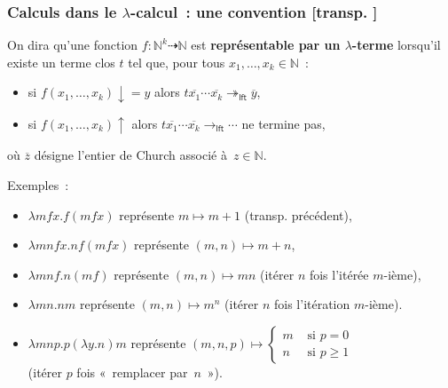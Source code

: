 \documentclass[mathserif,a4paper,aspectratio=169]{beamer}
\renewcommand{\frametitle}[1]{\subsubsection*{#1 {\footnotesize[transp. \insertframenumber]}}}
\begin{document}
%
\begin{frame}
\frametitle{Calculs dans le $\lambda$-calcul : une convention}

On dira qu'une fonction $f\colon \mathbb{N}^k \dasharrow \mathbb{N}$
est \textbf{représentable par un $\lambda$-terme} lorsqu'il existe un
terme clos $t$ tel que, pour tous $x_1,\ldots,x_k \in \mathbb{N}$ :
\begin{itemize}
\item si $f(x_1,\ldots,x_k){\downarrow}=y$ alors
  $t\overline{x_1}\cdots\overline{x_k}
  \twoheadrightarrow_{\mathsf{lft}} \overline{y}$,
\item si $f(x_1,\ldots,x_k){\uparrow}$ alors
  $t\overline{x_1}\cdots\overline{x_k} \rightarrow_{\mathsf{lft}}
  \cdots$ ne termine pas,
\end{itemize}
où $\overline{z}$ désigne l'entier de Church associé
à $z\in\mathbb{N}$.

\bigskip

Exemples :
\begin{itemize}
\item $\lambda mfx.f(mfx)$ représente $m \mapsto m+1$
  (transp. précédent),
\item $\lambda mnfx.nf(mfx)$ représente $(m,n) \mapsto m+n$,
\item $\lambda mnf.n(mf)$ représente $(m,n) \mapsto mn$ {\footnotesize
  (itérer $n$ fois l'itérée $m$-ième)},
\item $\lambda mn.nm$ représente $(m,n) \mapsto m^n$ {\footnotesize
  (itérer $n$ fois l'itération $m$-ième)}.
\item $\lambda mnp.p(\lambda y.n)m$ représente $(m,n,p) \mapsto
  \left\{\begin{array}{ll}m&\text{~si~}p=0\\n&\text{~si~}p\geq
  1\end{array}\right.$\\{\footnotesize (itérer $p$ fois « remplacer
    par $n$ »)}.
\end{itemize}

\end{frame}
%
\end{document}
